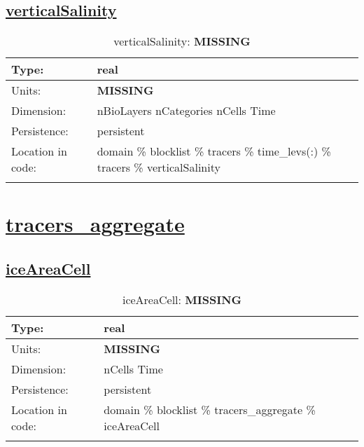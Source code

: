 \subsection[verticalSalinity]{\hyperref[sec:var_tab_tracers]{verticalSalinity}}
\label{subsec:var_sec_tracers_verticalSalinity}
\begin{center}
\begin{longtable}{| p{2.0in} | p{4.0in} |}
        \hline 
        Type: & real \\
        \hline 
        Units: & {\bf \color{red} MISSING} \\
        \hline 
        Dimension: & nBioLayers nCategories nCells Time \\
        \hline 
        Persistence: & persistent \\
        \hline 
         Location in code: & domain \% blocklist \% tracers \% time\_levs(:) \% tracers \% verticalSalinity \\
         \hline 
    \caption{verticalSalinity: {\bf \color{red} MISSING}}
\end{longtable}
\end{center}
\section[tracers\_aggregate]{\hyperref[sec:var_tab_tracers_aggregate]{tracers\_aggregate}}
\label{sec:var_sec_tracers_aggregate}
\subsection[iceAreaCell]{\hyperref[sec:var_tab_tracers_aggregate]{iceAreaCell}}
\label{subsec:var_sec_tracers_aggregate_iceAreaCell}
\begin{center}
\begin{longtable}{| p{2.0in} | p{4.0in} |}
        \hline 
        Type: & real \\
        \hline 
        Units: & {\bf \color{red} MISSING} \\
        \hline 
        Dimension: & nCells Time \\
        \hline 
        Persistence: & persistent \\
        \hline 
         Location in code: & domain \% blocklist \% tracers\_aggregate \% iceAreaCell \\
         \hline 
    \caption{iceAreaCell: {\bf \color{red} MISSING}}
\end{longtable}
\end{center}

